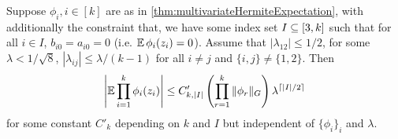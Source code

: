\documentclass[main.tex]{subfiles}
\begin{document}
\begin{lemma}\label{lemma:largeRhoMomentBound}
Suppose $\phi_i, i\in[k]$ are as in \cref{thm:multivariateHermiteExpectation}, with additionally  the constraint that, we have some index set $I \subseteq [3, k]$ such that for all $i \in I$, $b_{i0} = a_{i0} = 0$ (i.e. $\operatorname*{\mathbb{E}} \phi_i(z_i) = 0$).
Assume that $|\lambda_{12}| \le 1/2$, for some $\lambda < 1/\sqrt 8 $, $|\lambda_{ij}| \le \lambda/(k-1)$ for all $i \ne j$ and $\{i,j\} \ne \{1, 2\}$.
Then
\begin{align*}
    \left|\operatorname*{\mathbb{E}} \prod_{i=1}^k \phi_i(z_i)\right| \le
    C'_{k, |I|} \left( \prod_{r=1}^k \|\phi_r\|_G\right) 
        \lambda^{\lceil |I|/2\rceil}
\end{align*}
for some constant $C'_k$ depending on $k$ and $I$ but independent of $\{\phi_i\}_i$ and $\lambda$.
\end{lemma}
\end{document}
